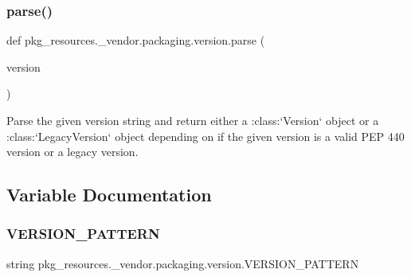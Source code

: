 \subsubsection{\texorpdfstring{parse()}{parse()}}
{\footnotesize\ttfamily def pkg\+\_\+resources.\+\_\+vendor.\+packaging.\+version.\+parse (\begin{DoxyParamCaption}\item[{}]{version }\end{DoxyParamCaption})}

\begin{DoxyVerb}Parse the given version string and return either a :class:`Version` object
or a :class:`LegacyVersion` object depending on if the given version is
a valid PEP 440 version or a legacy version.
\end{DoxyVerb}
 

\subsection{Variable Documentation}
\mbox{\label{namespacepkg__resources_1_1__vendor_1_1packaging_1_1version_aac23a877401bd51d980f997645b2acc2}} 
\subsubsection{\texorpdfstring{V\+E\+R\+S\+I\+O\+N\+\_\+\+P\+A\+T\+T\+E\+RN}{VERSION\_PATTERN}}
{\footnotesize\ttfamily string pkg\+\_\+resources.\+\_\+vendor.\+packaging.\+version.\+V\+E\+R\+S\+I\+O\+N\+\_\+\+P\+A\+T\+T\+E\+RN}

